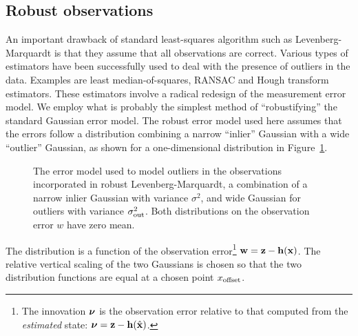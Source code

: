\subsection{Robust observations}
An important drawback of standard least-squares algorithm such as
Levenberg-Marquardt is that they assume that all observations are correct.
Various types of estimators have been successfully used to deal with
the presence of outliers in the data.
Examples are least median-of-squares, RANSAC and Hough transform estimators.
These estimators involve a radical redesign of the measurement error model.
We employ what is probably
the simplest method of ``robustifying'' the standard Gaussian error model.
The robust error model used here assumes that the errors follow a
distribution combining a narrow ``inlier'' Gaussian with a wide ``outlier''
Gaussian, as shown for a one-dimensional distribution in
Figure~\ref{gauss_mix}.
\begin{figure}
 \centerline{}
  \caption{The error model used to model outliers in the observations
	incorporated in robust Levenberg-Marquardt,
	a combination of a narrow inlier Gaussian with
	variance $\sigma^2$, and wide Gaussian for outliers with
	variance $\sigma_{\rm out}^2$. Both distributions on the
	observation error $w$ have zero mean.}
 \label{gauss_mix}
\end{figure}
The distribution is a function of the observation error\footnote{The innovation
$\mbox{\boldmath $\nu$}$ is the observation error relative to that computed from the
{\em estimated} state: $\mbox{\boldmath $\nu$} = {\bf z} - {\bf h}(\hat{\bf x})$.}
${\bf w} = {\bf z} - {\bf h}({\bf x})$.
The relative vertical scaling of the two Gaussians is chosen so that the
two distribution functions are equal at a chosen point $x_{\rm offset}$.

